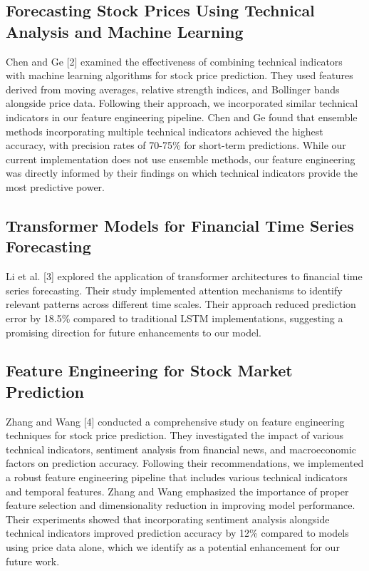 \documentclass[sigconf]{acmart}
\begin{document}
\subsection{Forecasting Stock Prices Using Technical Analysis and Machine Learning}

Chen and Ge [2] examined the effectiveness of combining technical indicators with machine learning algorithms for stock price prediction. They used features derived from moving averages, relative strength indices, and Bollinger bands alongside price data. Following their approach, we incorporated similar technical indicators in our feature engineering pipeline. Chen and Ge found that ensemble methods incorporating multiple technical indicators achieved the highest accuracy, with precision rates of 70-75\% for short-term predictions. While our current implementation does not use ensemble methods, our feature engineering was directly informed by their findings on which technical indicators provide the most predictive power.

\subsection{Transformer Models for Financial Time Series Forecasting}

Li et al. [3] explored the application of transformer architectures to financial time series forecasting. Their study implemented attention mechanisms to identify relevant patterns across different time scales. Their approach reduced prediction error by 18.5\% compared to traditional LSTM implementations, suggesting a promising direction for future enhancements to our model.

\subsection{Feature Engineering for Stock Market Prediction}

Zhang and Wang [4] conducted a comprehensive study on feature engineering techniques for stock price prediction. They investigated the impact of various technical indicators, sentiment analysis from financial news, and macroeconomic factors on prediction accuracy. Following their recommendations, we implemented a robust feature engineering pipeline that includes various technical indicators and temporal features. Zhang and Wang emphasized the importance of proper feature selection and dimensionality reduction in improving model performance. Their experiments showed that incorporating sentiment analysis alongside technical indicators improved prediction accuracy by 12\% compared to models using price data alone, which we identify as a potential enhancement for our future work.
\end{document}
